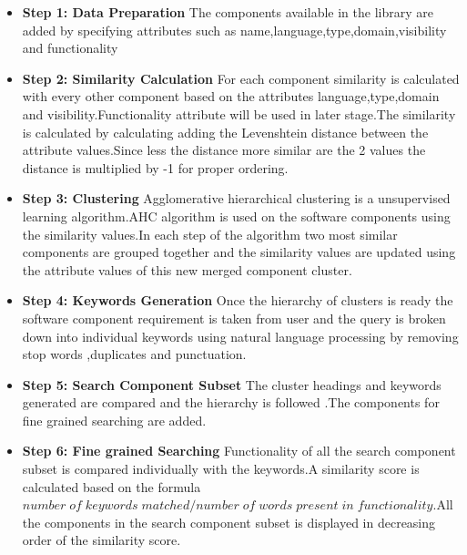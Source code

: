 \documentclass[a4paper,12pt]{article}
\begin{document}
\begin{itemize}
    \item \textbf{Step 1: Data Preparation} The components available in the library are added by specifying attributes such as name,language,type,domain,visibility and functionality
    \item \textbf{Step 2: Similarity Calculation} For each component
    similarity is calculated with every other component based on the attributes language,type,domain and visibility.Functionality attribute will be used in later stage.The similarity is calculated by calculating adding the Levenshtein distance between the attribute values.Since less the distance more similar are the 2 values the distance is multiplied by -1 for proper ordering.

    \item \textbf{Step 3: Clustering} Agglomerative hierarchical clustering is a unsupervised learning algorithm.AHC algorithm is used on the software components using the similarity values.In each step of the algorithm two most similar components are grouped together and the similarity values are updated using the attribute values of this new merged component cluster.
    \item \textbf{Step 4: Keywords Generation} Once the hierarchy of clusters is ready the software component requirement is taken from user and the query is broken down into individual keywords using natural language processing by removing stop words ,duplicates and punctuation.
    \item \textbf{Step 5: Search Component Subset} The cluster headings and keywords generated are compared and the hierarchy is followed .The components for fine grained searching are added.
    \item \textbf{Step 6: Fine grained Searching} Functionality of all the search component subset is compared individually with the keywords.A similarity score is calculated based on the formula
    $number\;of\;keywords\;matched/number\;of\;words\;present\;in\; functionality$.All the components in the search component subset is displayed in decreasing order of the similarity score.
\end{itemize}
\end{document}
